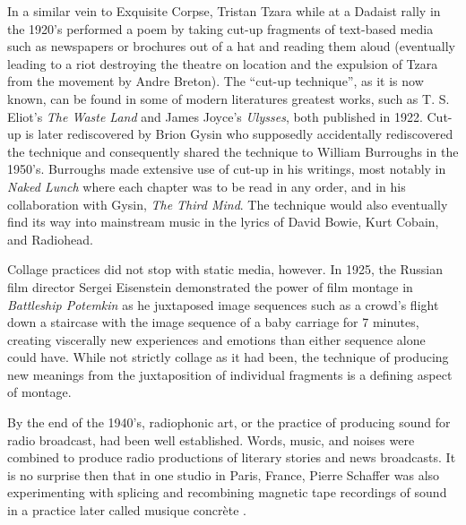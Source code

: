 In a similar vein to Exquisite Corpse, Tristan Tzara while at a Dadaist rally in the 1920's performed a poem by taking cut-up fragments of text-based media such as newspapers or brochures out of a hat and reading them aloud (eventually leading to a riot destroying the theatre on location and the expulsion of Tzara from the movement by Andre Breton).  The ``cut-up technique'', as it is now known, can be found in some of modern literatures greatest works, such as T. S. Eliot's \textit{The Waste Land} and James Joyce's \textit{Ulysses}, both published in 1922.  Cut-up is later rediscovered by Brion Gysin who supposedly accidentally rediscovered the technique and consequently shared the technique to William Burroughs in the 1950's.  Burroughs made extensive use of cut-up in his writings, most notably in \textit{Naked Lunch} where each chapter was to be read in any order, and in his collaboration with Gysin, \textit{The Third Mind}.  The technique would also eventually find its way into mainstream music in the lyrics of David Bowie, Kurt Cobain, and Radiohead.  %

Collage practices did not stop with static media, however.  In 1925, the Russian film director Sergei Eisenstein demonstrated the power of film montage in \textit{Battleship Potemkin} as he juxtaposed image sequences such as a crowd's flight down a staircase with the image sequence of a baby carriage for 7 minutes, creating viscerally new experiences and emotions than either sequence alone could have.  While not strictly collage as it had been, the technique of producing new meanings from the juxtaposition of individual fragments is a defining aspect of montage.

By the end of the 1940's, radiophonic art, or the practice of producing sound for radio broadcast, had been well established.  Words, music, and noises were combined to produce radio productions of literary stories and news broadcasts.  It is no surprise then that in one studio in Paris, France, Pierre Schaffer was also experimenting with splicing and recombining magnetic tape recordings of sound in a practice later called musique concr\`ete \cite{}.   %

